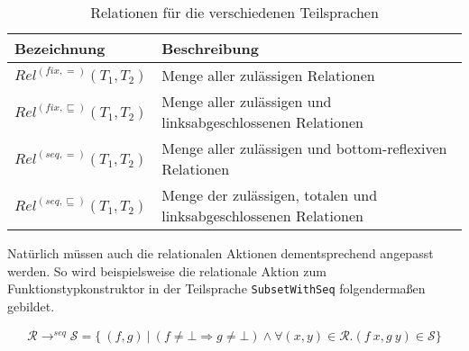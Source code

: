 \begin{table}[th]
\centering
\begin{tabular}{| l | l |}
\hline
Bezeichnung & Beschreibung \\
\hline
$Rel^{(fix, =)}(T_1, T_2)$ & Menge aller zulässigen Relationen \\
$Rel^{(fix, \sqsubseteq)}(T_1, T_2)$ & Menge aller zulässigen und linksabgeschlossenen Relationen \\
$Rel^{(seq, =)}(T_1, T_2)$ & Menge aller zulässigen und bottom-reflexiven Relationen \\
$Rel^{(seq, \sqsubseteq)}(T_1, T_2)$ & Menge der zulässigen, totalen und linksabgeschlossenen Relationen \\
\hline
\end{tabular}
\caption{Relationen für die verschiedenen Teilsprachen}
\label{tab:relations}
\end{table}



Natürlich müssen auch die relationalen Aktionen dementsprechend angepasst werden. So wird beispielsweise die relationale
Aktion zum Funktionstypkonstruktor in der Teilsprache \texttt{SubsetWithSeq} folgendermaßen gebildet.

\begin{align*}
\mathcal{R} \rightarrow^{seq} \mathcal{S} = \{~(f, g)~|~(f \neq \bot \Rightarrow g \neq \bot) \wedge
\forall (x, y) \in \mathcal{R}. (f\ x, g\ y) \in \mathcal{S} \}
\end{align*}